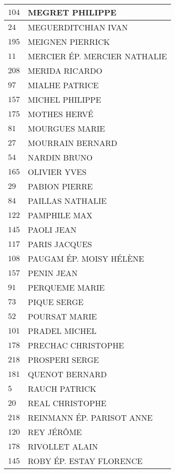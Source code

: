 \begin{xltabular}{\linewidth}{|l|X|}
    \hline
    $104$ & MEGRET PHILIPPE \\
    \hline
    $24$ & MEGUERDITCHIAN IVAN \\
    \hline
    $195$ & MEIGNEN PIERRICK \\
    \hline
    $11$ & MERCIER ÉP. MERCIER NATHALIE \\
    \hline
    $208$ & MERIDA RICARDO \\
    \hline
    $97$ & MIALHE PATRICE \\
    \hline
    $157$ & MICHEL PHILIPPE \\
    \hline
    $175$ & MOTHES HERVÉ \\
    \hline
    $81$ & MOURGUES MARIE \\
    \hline
    $27$ & MOURRAIN BERNARD \\
    \hline
    $54$ & NARDIN BRUNO \\
    \hline
    $165$ & OLIVIER YVES \\
    \hline
    $29$ & PABION PIERRE \\
    \hline
    $84$ & PAILLAS NATHALIE \\
    \hline
    $122$ & PAMPHILE MAX \\
    \hline
    $145$ & PAOLI JEAN \\
    \hline
    $117$ & PARIS JACQUES \\
    \hline
    $108$ & PAUGAM ÉP. MOISY HÉLÈNE \\
    \hline
    $157$ & PENIN JEAN \\
    \hline
    $91$ & PERQUEME MARIE \\
    \hline
    $73$ & PIQUE SERGE \\
    \hline
    $52$ & POURSAT MARIE \\
    \hline
    $101$ & PRADEL MICHEL \\
    \hline
    $178$ & PRECHAC CHRISTOPHE \\
    \hline
    $218$ & PROSPERI SERGE \\
    \hline
    $181$ & QUENOT BERNARD \\
    \hline
    $5$ & RAUCH PATRICK \\
    \hline
    $20$ & REAL CHRISTOPHE \\
    \hline
    $218$ & REINMANN ÉP. PARISOT ANNE \\
    \hline
    $120$ & REY JÉRÔME \\
    \hline
    $178$ & RIVOLLET ALAIN \\
    \hline
    $145$ & ROBY ÉP. ESTAY FLORENCE \\

\end{xltabular}
